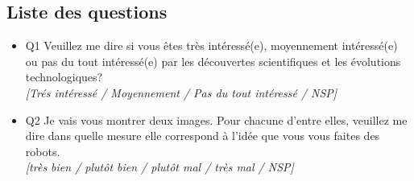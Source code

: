 \subsection*{Liste des questions}
\begin{itemize}
  \item Q1 Veuillez me dire si vous êtes très intéressé(e), moyennement intéressé(e) ou pas du tout intéressé(e) par les découvertes scientifiques et les évolutions technologiques?\\
  \textit{[Trés intéressé / Moyennement / Pas du tout intéressé / NSP]}\\
  \item Q2 Je vais vous montrer deux images. Pour chacune d’entre elles, veuillez me dire dans quelle mesure elle correspond à l’idée que vous vous faites des robots.\\
  \textit{[très bien / plutôt bien / plutôt mal / très mal / NSP]}
\end{itemize}

\strut

